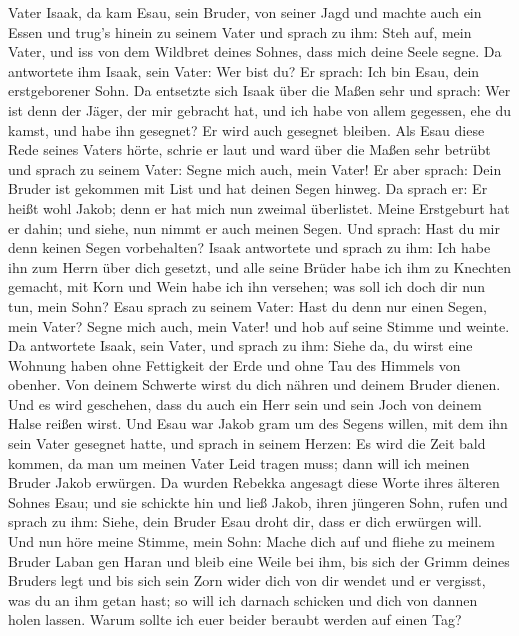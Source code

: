 Vater Isaak, da kam Esau, sein Bruder, von seiner Jagd  und
machte auch ein Essen und trug's hinein zu seinem Vater und sprach zu
ihm: Steh auf, mein Vater, und iss von dem Wildbret deines Sohnes, dass
mich deine Seele segne.  Da antwortete ihm Isaak, sein
Vater: Wer bist du? Er sprach: Ich bin Esau, dein erstgeborener Sohn.
 Da entsetzte sich Isaak über die Maßen sehr und sprach:
Wer ist denn der Jäger, der mir gebracht hat, und ich habe von allem
gegessen, ehe du kamst, und habe ihn gesegnet? Er wird auch gesegnet
bleiben.  Als Esau diese Rede seines Vaters hörte, schrie
er laut und ward über die Maßen sehr betrübt und sprach zu seinem Vater:
Segne mich auch, mein Vater!  Er aber sprach: Dein Bruder
ist gekommen mit List und hat deinen Segen hinweg.  Da
sprach er: Er heißt wohl Jakob; denn er hat mich nun zweimal überlistet.
Meine Erstgeburt hat er dahin; und siehe, nun nimmt er auch meinen
Segen. Und sprach: Hast du mir denn keinen Segen vorbehalten?
 Isaak antwortete und sprach zu ihm: Ich habe ihn zum Herrn
über dich gesetzt, und alle seine Brüder habe ich ihm zu Knechten
gemacht, mit Korn und Wein habe ich ihn versehen; was soll ich doch dir
nun tun, mein Sohn?  Esau sprach zu seinem Vater: Hast du
denn nur einen Segen, mein Vater? Segne mich auch, mein Vater! und hob
auf seine Stimme und weinte.  Da antwortete Isaak, sein
Vater, und sprach zu ihm: Siehe da, du wirst eine Wohnung haben ohne
Fettigkeit der Erde und ohne Tau des Himmels von obenher. 
Von deinem Schwerte wirst du dich nähren und deinem Bruder dienen. Und
es wird geschehen, dass du auch ein Herr sein und sein Joch von deinem
Halse reißen wirst.  Und Esau war Jakob gram um des Segens
willen, mit dem ihn sein Vater gesegnet hatte, und sprach in seinem
Herzen: Es wird die Zeit bald kommen, da man um meinen Vater Leid tragen
muss; dann will ich meinen Bruder Jakob erwürgen.  Da
wurden Rebekka angesagt diese Worte ihres älteren Sohnes Esau; und sie
schickte hin und ließ Jakob, ihren jüngeren Sohn, rufen und sprach zu
ihm: Siehe, dein Bruder Esau droht dir, dass er dich erwürgen will.
 Und nun höre meine Stimme, mein Sohn: Mache dich auf und
fliehe zu meinem Bruder Laban gen Haran  und bleib eine
Weile bei ihm, bis sich der Grimm deines Bruders legt  und
bis sich sein Zorn wider dich von dir wendet und er vergisst, was du an
ihm getan hast; so will ich darnach schicken und dich von dannen holen
lassen. Warum sollte ich euer beider beraubt werden auf einen Tag?
